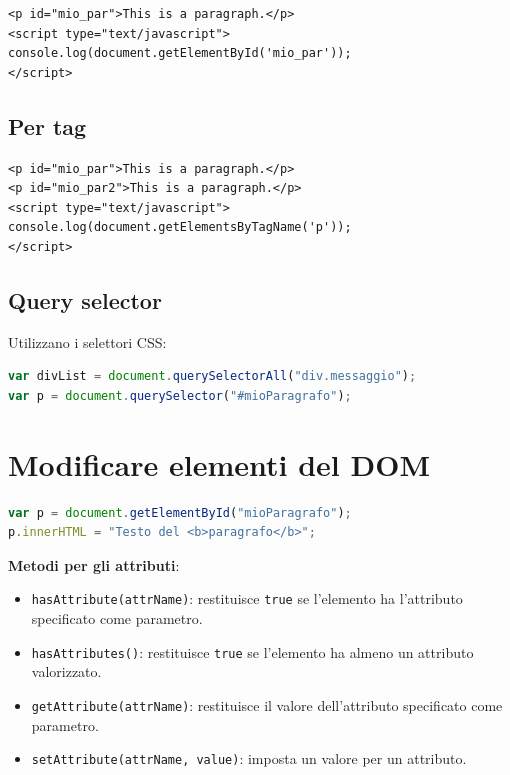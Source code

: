 \begin{lstlisting}[language=HTML5]
<p id="mio_par">This is a paragraph.</p>
<script type="text/javascript">
console.log(document.getElementById('mio_par'));
</script>
\end{lstlisting}

\subsection{Per tag}

\begin{lstlisting}[language=HTML5]
<p id="mio_par">This is a paragraph.</p>
<p id="mio_par2">This is a paragraph.</p>
<script type="text/javascript">
console.log(document.getElementsByTagName('p'));
</script>
\end{lstlisting}

\subsection{Query selector}

Utilizzano i selettori CSS:

\begin{lstlisting}[language=JavaScript]
var divList = document.querySelectorAll("div.messaggio");
var p = document.querySelector("#mioParagrafo");
\end{lstlisting}

\section{Modificare elementi del DOM}

\begin{lstlisting}[language=JavaScript]
var p = document.getElementById("mioParagrafo");
p.innerHTML = "Testo del <b>paragrafo</b>";
\end{lstlisting}

\textbf{Metodi per gli attributi}:
\begin{itemize}
    \item \texttt{hasAttribute(attrName)}: restituisce \texttt{true} se l'elemento ha l'attributo specificato come parametro.
    \item \texttt{hasAttributes()}: restituisce \texttt{true} se l'elemento ha almeno un attributo valorizzato.
    \item \texttt{getAttribute(attrName)}: restituisce il valore dell'attributo specificato come parametro.
    \item \texttt{setAttribute(attrName, value)}: imposta un valore per un attributo.
\end{itemize}

